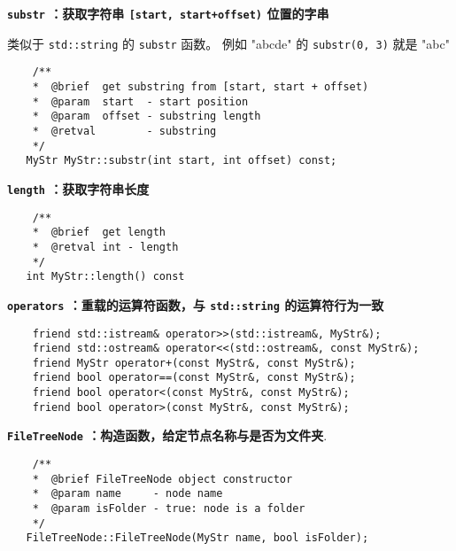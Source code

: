 \documentclass[a4paper]{ctexart}
\begin{document}
\newpage

\noindent \textbf{\texttt{substr} ：获取字符串 \texttt{[start, start+offset)} 位置的字串}

类似于 \texttt{std::string} 的 \texttt{substr} 函数。 例如 "abcde" 的 \texttt{substr(0, 3)} 就是 "abc"

\begin{lstlisting}
    /**
    *  @brief  get substring from [start, start + offset)
    *  @param  start  - start position
    *  @param  offset - substring length
    *  @retval        - substring
    */
   MyStr MyStr::substr(int start, int offset) const;
\end{lstlisting}

\vspace{3em}

\noindent \textbf{\texttt{length} ：获取字符串长度}

\begin{lstlisting}
    /**
    *  @brief  get length
    *  @retval int - length
    */
   int MyStr::length() const
\end{lstlisting}

\vspace{3em}

\noindent \textbf{\texttt{operators} ：重载的运算符函数，与 \texttt{std::string} 的运算符行为一致}

\begin{lstlisting}
    friend std::istream& operator>>(std::istream&, MyStr&);
    friend std::ostream& operator<<(std::ostream&, const MyStr&);
    friend MyStr operator+(const MyStr&, const MyStr&);
    friend bool operator==(const MyStr&, const MyStr&);
    friend bool operator<(const MyStr&, const MyStr&);
    friend bool operator>(const MyStr&, const MyStr&);
\end{lstlisting}

\vspace{3em}


\noindent \textbf{\texttt{FileTreeNode} ：构造函数，给定节点名称与是否为文件夹}.

\begin{lstlisting}
    /**
    *  @brief FileTreeNode object constructor
    *  @param name     - node name
    *  @param isFolder - true: node is a folder
    */
   FileTreeNode::FileTreeNode(MyStr name, bool isFolder);
\end{lstlisting}

\vspace{3em}
\end{document}
